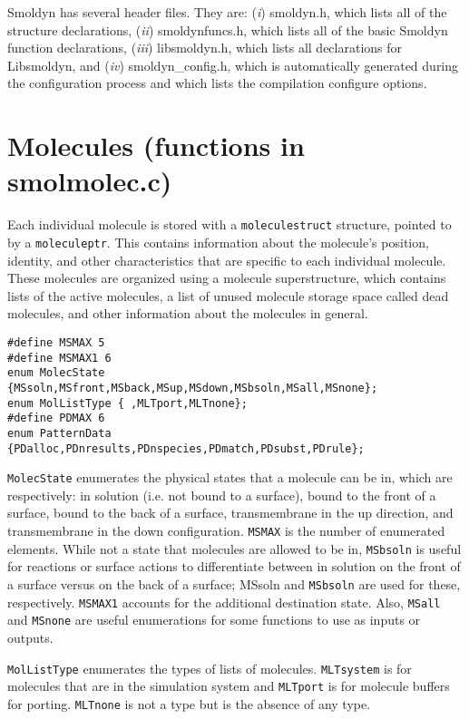 \documentclass {book}
\begin{document}
Smoldyn has several header files. They are: (\emph{i}) smoldyn.h, which lists all of the structure declarations, (\emph{ii}) smoldynfuncs.h, which lists all of the basic Smoldyn function declarations, (\emph{iii}) libsmoldyn.h, which lists all declarations for Libsmoldyn, and (\emph{iv}) smoldyn\_config.h, which is automatically generated during the configuration process and which lists the compilation configure options.

\section{Molecules (functions in smolmolec.c)}

Each individual molecule is stored with a \texttt{moleculestruct} structure, pointed to by a \texttt{moleculeptr}. This contains information about the molecule's position, identity, and other characteristics that are specific to each individual molecule. These molecules are organized using a molecule superstructure, which contains lists of the active molecules, a list of unused molecule storage space called dead molecules, and other information about the molecules in general.

\begin{lstlisting}
#define MSMAX 5
#define MSMAX1 6
enum MolecState {MSsoln,MSfront,MSback,MSup,MSdown,MSbsoln,MSall,MSnone};
enum MolListType { ,MLTport,MLTnone};
#define PDMAX 6
enum PatternData {PDalloc,PDnresults,PDnspecies,PDmatch,PDsubst,PDrule};
\end{lstlisting}

\texttt{MolecState} enumerates the physical states that a molecule can be in, which are respectively: in solution (i.e. not bound to a surface), bound to the front of a surface, bound to the back of a surface, transmembrane in the up direction, and transmembrane in the down configuration. \texttt{MSMAX} is the number of enumerated elements. While not a state that molecules are allowed to be in, \texttt{MSbsoln} is useful for reactions or surface actions to differentiate between in solution on the front of a surface versus on the back of a surface; MSsoln and \texttt{MSbsoln} are used for these, respectively. \texttt{MSMAX1} accounts for the additional destination state. Also, \texttt{MSall} and \texttt{MSnone} are useful enumerations for some functions to use as inputs or outputs.

\texttt{MolListType} enumerates the types of lists of molecules. \texttt{MLTsystem} is for molecules that are in the simulation system and \texttt{MLTport} is for molecule buffers for porting. \texttt{MLTnone} is not a type but is the absence of any type.
\end{document}
